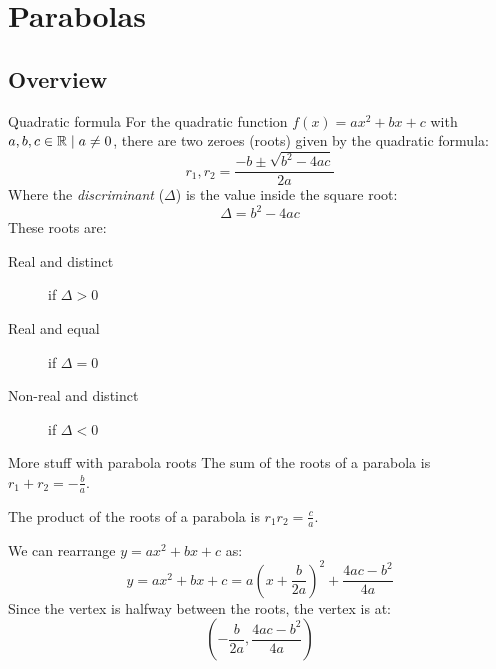 \section{Parabolas}
\subsection{Overview}
\begin{namedframe}{Quadratic formula}
	For the quadratic function $f(x) = ax^2 + bx + c$ with $a, b, c \in \mathbb{R} \mid a \neq 0$, there are two zeroes (roots) given by the quadratic formula:
	\[r_1, r_2 = \frac{-b \pm \sqrt{b^2 - 4ac}}{2a}\]
	Where the \emph{discriminant} ($\Delta$) is the value inside the square root:
	\[\Delta = b^2 - 4ac\]
	These roots are:
	\begin{description}
		\item[Real and distinct] if $\Delta > 0$
		\item[Real and equal] if $\Delta = 0$
		\item[Non-real and distinct] if $\Delta < 0$
	\end{description}
\end{namedframe}
\begin{namedframe}{More stuff with parabola roots}
	The sum of the roots of a parabola is $r_1 + r_2 = -\frac{b}{a}$.

	The product of the roots of a parabola is $r_1r_2 = \frac{c}{a}$.

	We can rearrange $y = ax^2 + bx + c$ as:
	\[y = ax^2 + bx + c = a \left( x + \frac{b}{2a} \right)^2 + \frac{4ac - b^2}{4a}\]
	Since the vertex is halfway between the roots, the vertex is at:
	\[\left( -\frac{b}{2a}, \frac{4ac - b^2}{4a} \right)\]
\end{namedframe}
